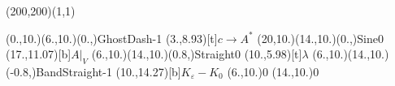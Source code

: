 \unitlength=1bp%

\begin{feynartspicture}(200,200)(1,1)

\FADiagram{}
\FAProp(0.,10.)(6.,10.)(0.,){GhostDash}{-1}
\FALabel(3.,8.93)[t]{$c\to A^*$}
\FAProp(20,10.)(14.,10.)(0.,){Sine}{0}
\FALabel(17.,11.07)[b]{$A|_V$}
\FAProp(6.,10.)(14.,10.)(0.8,){Straight}{0}
\FALabel(10.,5.98)[t]{$\lambda$}
\FAProp(6.,10.)(14.,10.)(-0.8,){BandStraight}{-1}
\FALabel(10.,14.27)[b]{$K_\varepsilon-K_0$}
\FAVert(6.,10.){0}
\FAVert(14.,10.){0}
\end{feynartspicture}

